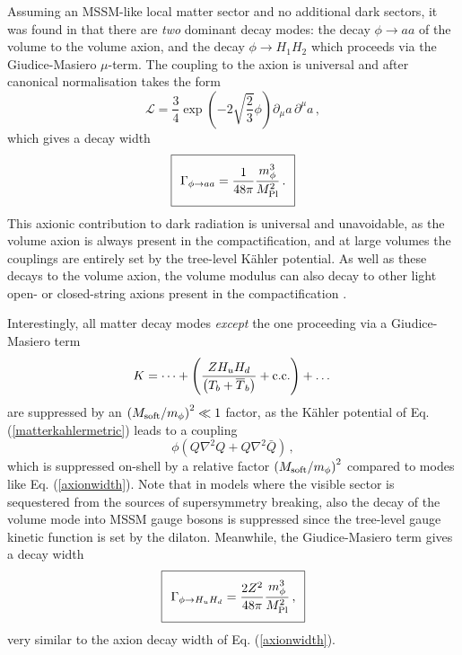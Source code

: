 Assuming an MSSM-like local matter sector and no additional dark sectors, it was found in \cite{Cicoli:2012aq, 12083563} that there are \emph{two} dominant decay modes: the decay $\phi \to aa$ of the volume to the volume axion, and the decay $\phi \to H_1 H_2$ which proceeds via the Giudice-Masiero $\mu$-term. The coupling to the axion is universal and after canonical normalisation takes the form \cite{Cicoli:2012aq, 12083563}
\begin{equation}
\mathcal{L} = \frac34 \exp \left( -2 \sqrt{\frac23} \phi \right) \partial_{\mu} a \,\partial^{\mu} a\,,
\end{equation}
which gives a decay width
\begin{equation}
\setlength\fboxsep{0.25cm}
\setlength\fboxrule{0.4pt}
\boxed{
\Gamma_{\phi \to aa} = \frac{1}{48 \pi} \frac{m_\phi^3}{M_{\rm Pl}^2}\,.
}
\label{axionwidth}
\end{equation}
This axionic contribution to dark radiation is universal and unavoidable, as the volume axion is always present in the compactification, and at large volumes the couplings are entirely set by the tree-level K\"ahler potential. As well as these decays to the volume axion, the volume modulus can also decay to other light open- or closed-string axions present in the compactification \cite{210713383, Cicoli:2022uqa}.

Interestingly, all matter decay modes \emph{except} the one proceeding via a Giudice-Masiero term 
\begin{equation}
K = \dots + \left( \frac{Z H_u H_d}{\left( T_b + \overline{T}_b \right)} + {\rm c.c.} \right) + \dots 
\end{equation}
are  suppressed by an $\left(M_{\rm soft}/m_\phi\right)^2\ll 1$ factor, as the K\"ahler potential of Eq. (\ref{matterkahlermetric}) leads to a coupling
\begin{equation}
\phi ( {Q} \nabla^2 Q + Q \nabla^2 \bar{Q})\,,
\end{equation}
which is suppressed on-shell by a relative factor $\left(M_{\rm soft}/m_\phi\right)^2$ compared to modes like Eq. (\ref{axionwidth}). Note that in models where the visible sector is sequestered from the sources of supersymmetry breaking, also the decay of the volume mode into MSSM gauge bosons is suppressed since the tree-level gauge kinetic function is set by the dilaton. Meanwhile, the Giudice-Masiero term gives a decay width
\begin{equation}
\setlength\fboxsep{0.25cm}
\setlength\fboxrule{0.4pt}
\boxed{
\Gamma_{\phi \to H_u H_d} = \frac{2 Z^2}{48 \pi} \frac{m_\phi^3}{M_{\rm Pl}^2}\,,
}
\end{equation}
very similar to the axion decay width of Eq. (\ref{axionwidth}). 

